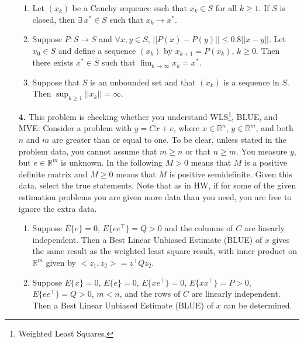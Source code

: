 \documentclass[letterpaper]{article}
\newcommand{\real}{\mathbb R}  %
\begin{document}
\begin{enumerate}
\begin{enumerate}
\item Let $(x_k)$ be a Cauchy sequence such that $x_k \in S$ for all $k\ge1$. If $S$ is closed, then $\exists~x^* \in {S}$ such that $ x_k\to x^*$.

\item Suppose $P:S \to S$ and $\forall x,y \in S$, $||P(x)-P(y)|| \le 0.8 ||x-y|| $. Let  $x_0\in S$ and define a sequence $(x_k)$ by $x_{k+1}=P(x_k)$, $k \ge0$. Then there exists $x^* \in \bar{S}$ such that $ \lim_{k \to \infty} x_k=x^*$.


\item Suppose that $S$ is an unbounded set and that $(x_k)$ is a sequence in $S$. Then $\sup_{k \ge 1} ||x_k|| = \infty.$

\end{enumerate}




\item[{\bf 4.}] This problem is checking whether you understand WLS\footnote{Weighted Least Squares.}, BLUE, and MVE: Consider a problem with $y=Cx+e$, where $x\in \real^n$, $y\in \real^m$, and both $n$ and $m$ are greater than or equal to one. To be clear, unless stated in the problem data, you cannot assume that $m \ge n$ or that $n \ge m$. You measure $y$, but $e\in \real^m$ is unknown. In the following $M >0$ means that $M$ is a positive definite matrix and $M\ge0$ means that $M$ is positive semidefinite. Given this data, select the true statements. Note that as in HW, if for some of the given estimation problems you are given more data than you need, you are free to ignore the extra data.
\begin{enumerate}
\setlength{\itemsep}{.15in}
\renewcommand{\labelenumi}{(\alph{enumi})}
\setlength{\itemsep}{.1in}




\item  Suppose  $E\{e\}=0$, $E\{e e^\top\}=Q >0$ and the columns of $C$ are linearly independent. Then a Best Linear Unbiased Estimate (BLUE) of $x$ gives the same result as the weighted least square result, with inner product on $\real^m$ given by $<z_1, z_2>=z^\top Q z_2$.


\item  Suppose $E\{x\}=0$, $E\{e\}=0$, $E\{xe^\top\}=0$,  $E\{x x^\top\}=P > 0$, $E\{e e^\top\}=Q > 0$,   $m < n$, and the rows of $C$ are linearly independent. Then a Best Linear Unbiased Estimate (BLUE) of $x$ can be determined.





\end{enumerate}
\end{enumerate}
\end{document}
